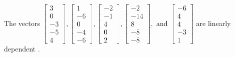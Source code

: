 \begin{exercise}
\begin{exerciseStatement}
  \end{exerciseStatement}
  \begin{exerciseAnswer}
   The vectors \(\left[\begin{array}{r}
3 \\
0 \\
-3 \\
-5 \\
4
\end{array}\right] , \left[\begin{array}{r}
1 \\
-6 \\
0 \\
-4 \\
-6
\end{array}\right] , \left[\begin{array}{r}
-2 \\
-1 \\
4 \\
0 \\
2
\end{array}\right] , \left[\begin{array}{r}
-2 \\
-14 \\
8 \\
-8 \\
-8
\end{array}\right] , \text{ and } \left[\begin{array}{r}
-6 \\
4 \\
4 \\
-3 \\
1
\end{array}\right]\) are 
  	 linearly dependent  .
  


  \end{exerciseAnswer}
\end{exercise}